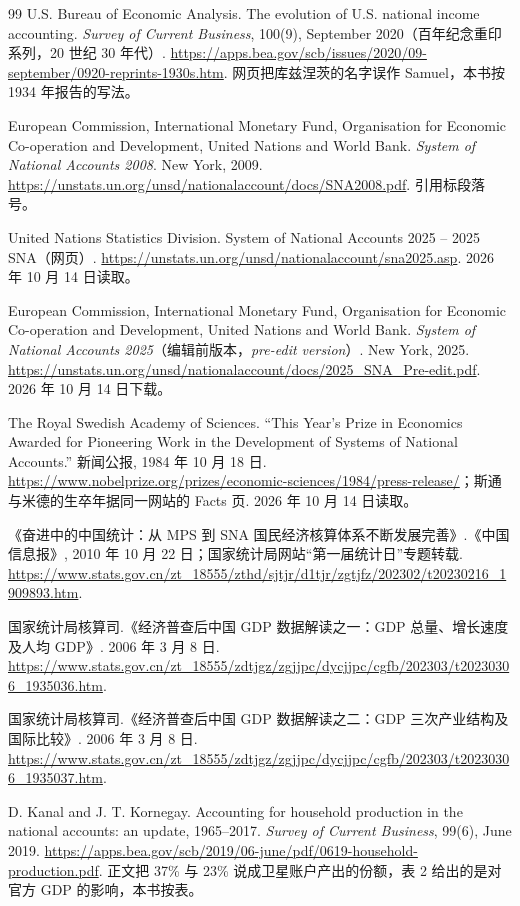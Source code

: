 \begin{thebibliography}{99}
 U.S. Bureau of Economic Analysis. The evolution of U.S. national income accounting. \emph{Survey of Current Business}, 100(9), September 2020（百年纪念重印系列，20 世纪 30 年代）. \url{https://apps.bea.gov/scb/issues/2020/09-september/0920-reprints-1930s.htm}. 网页把库兹涅茨的名字误作 Samuel，本书按 1934 年报告的写法。

 European Commission, International Monetary Fund, Organisation for Economic Co-operation and Development, United Nations and World Bank. \emph{System of National Accounts 2008}. New York, 2009. \url{https://unstats.un.org/unsd/nationalaccount/docs/SNA2008.pdf}. 引用标段落号。

 United Nations Statistics Division. System of National Accounts 2025 -- 2025 SNA（网页）. \url{https://unstats.un.org/unsd/nationalaccount/sna2025.asp}. 2026 年 10 月 14 日读取。

 European Commission, International Monetary Fund, Organisation for Economic Co-operation and Development, United Nations and World Bank. \emph{System of National Accounts 2025}（编辑前版本，\emph{pre-edit version}）. New York, 2025. \url{https://unstats.un.org/unsd/nationalaccount/docs/2025_SNA_Pre-edit.pdf}. 2026 年 10 月 14 日下载。

 The Royal Swedish Academy of Sciences. ``This Year's Prize in Economics Awarded for Pioneering Work in the Development of Systems of National Accounts.'' 新闻公报, 1984 年 10 月 18 日. \url{https://www.nobelprize.org/prizes/economic-sciences/1984/press-release/}；斯通与米德的生卒年据同一网站的 Facts 页. 2026 年 10 月 14 日读取。

 《奋进中的中国统计：从 MPS 到 SNA 国民经济核算体系不断发展完善》.《中国信息报》, 2010 年 10 月 22 日；国家统计局网站“第一届统计日”专题转载. \url{https://www.stats.gov.cn/zt_18555/zthd/sjtjr/d1tjr/zgtjfz/202302/t20230216_1909893.htm}.

 国家统计局核算司.《经济普查后中国 GDP 数据解读之一：GDP 总量、增长速度及人均 GDP》. 2006 年 3 月 8 日. \url{https://www.stats.gov.cn/zt_18555/zdtjgz/zgjjpc/dycjjpc/cgfb/202303/t20230306_1935036.htm}.

 国家统计局核算司.《经济普查后中国 GDP 数据解读之二：GDP 三次产业结构及国际比较》. 2006 年 3 月 8 日. \url{https://www.stats.gov.cn/zt_18555/zdtjgz/zgjjpc/dycjjpc/cgfb/202303/t20230306_1935037.htm}.

 D. Kanal and J. T. Kornegay. Accounting for household production in the national accounts: an update, 1965--2017. \emph{Survey of Current Business}, 99(6), June 2019. \url{https://apps.bea.gov/scb/2019/06-june/pdf/0619-household-production.pdf}. 正文把 37\% 与 23\% 说成卫星账户产出的份额，表 2 给出的是对官方 GDP 的影响，本书按表。


\end{thebibliography}
